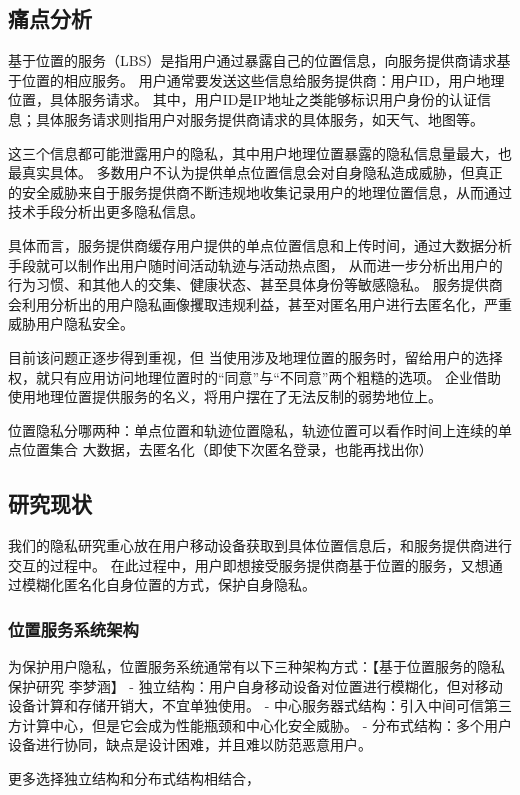 \documentclass[zihao=-4]{ctexart}
\begin{document}
\subsection{痛点分析}
基于位置的服务（LBS）是指用户通过暴露自己的位置信息，向服务提供商请求基于位置的相应服务。
用户通常要发送这些信息给服务提供商：用户ID，用户地理位置，具体服务请求。
其中，用户ID是IP地址之类能够标识用户身份的认证信息；具体服务请求则指用户对服务提供商请求的具体服务，如天气、地图等。
\par
这三个信息都可能泄露用户的隐私，其中用户地理位置暴露的隐私信息量最大，也最真实具体。
多数用户不认为提供单点位置信息会对自身隐私造成威胁，但真正的安全威胁来自于服务提供商不断违规地收集记录用户的地理位置信息，从而通过技术手段分析出更多隐私信息。
\par
具体而言，服务提供商缓存用户提供的单点位置信息和上传时间，通过大数据分析手段就可以制作出用户随时间活动轨迹与活动热点图，
从而进一步分析出用户的行为习惯、和其他人的交集、健康状态、甚至具体身份等敏感隐私。
服务提供商会利用分析出的用户隐私画像攫取违规利益，甚至对匿名用户进行去匿名化，严重威胁用户隐私安全。


\par
目前该问题正逐步得到重视，但
当使用涉及地理位置的服务时，留给用户的选择权，就只有应用访问地理位置时的“同意”与“不同意”两个粗糙的选项。
企业借助使用地理位置提供服务的名义，将用户摆在了无法反制的弱势地位上。

位置隐私分哪两种：单点位置和轨迹位置隐私，轨迹位置可以看作时间上连续的单点位置集合
大数据，去匿名化（即使下次匿名登录，也能再找出你）

\subsection{研究现状}
我们的隐私研究重心放在用户移动设备获取到具体位置信息后，和服务提供商进行交互的过程中。
在此过程中，用户即想接受服务提供商基于位置的服务，又想通过模糊化匿名化自身位置的方式，保护自身隐私。

\subsubsection{位置服务系统架构}
为保护用户隐私，位置服务系统通常有以下三种架构方式：【基于位置服务的隐私保护研究 李梦涵】
- 独立结构：用户自身移动设备对位置进行模糊化，但对移动设备计算和存储开销大，不宜单独使用。
- 中心服务器式结构：引入中间可信第三方计算中心，但是它会成为性能瓶颈和中心化安全威胁。
- 分布式结构：多个用户设备进行协同，缺点是设计困难，并且难以防范恶意用户。

更多选择独立结构和分布式结构相结合，
\end{document}
